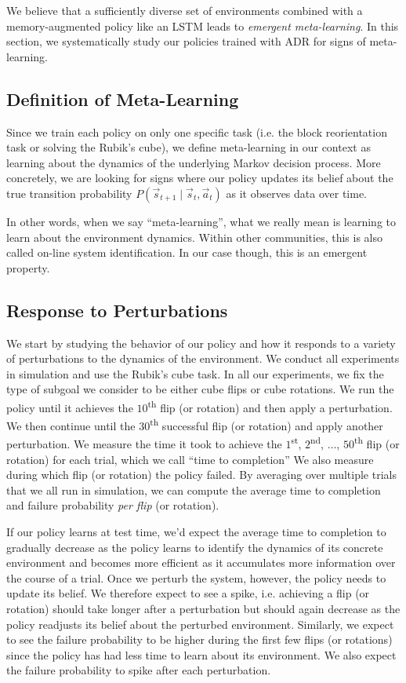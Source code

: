 We believe that a sufficiently diverse set of environments combined with a memory-augmented policy like an LSTM leads to \emph{emergent meta-learning}.
In this section, we systematically study our policies trained with ADR for signs of meta-learning.

\subsection{Definition of Meta-Learning}
Since we train each policy on only one specific task (i.e. the block reorientation task or solving the Rubik's cube), we define meta-learning in our context as learning about the dynamics of the underlying Markov decision process. More concretely, we are looking for signs where our policy updates its belief about the true transition probability $P(\vec{s}_{t+1} \mid \vec{s}_t, \vec{a}_t)$ as it observes data over time.

In other words, when we say ``meta-learning'', what we really mean is learning to learn about the environment dynamics. Within other communities, this is also called on-line system identification. In our case though, this is an emergent property.

\subsection{Response to Perturbations}
We start by studying the behavior of our policy and how it responds to a variety of perturbations to the dynamics of the environment. We conduct all experiments in simulation and use the Rubik's cube task. In all our experiments, we fix the type of subgoal we consider to be either cube flips or cube rotations. We run the policy until it achieves the $10$\textsuperscript{th} flip (or rotation) and then apply a perturbation. We then continue until the $30$\textsuperscript{th} successful flip (or rotation) and apply another perturbation. We measure the time it took to achieve the $1$\textsuperscript{st}, $2$\textsuperscript{nd}, $\ldots$, $50$\textsuperscript{th} flip (or rotation) for each trial, which we call ``time to completion'' We also measure during which flip (or rotation) the policy failed. By averaging over multiple trials that we all run in simulation, we can compute the average time to completion and failure probability \emph{per flip} (or rotation).

If our policy learns at test time, we'd expect the average time to completion to gradually decrease as the policy learns to identify the dynamics of its concrete environment and becomes more efficient as it accumulates more information over the course of a trial. Once we perturb the system, however, the policy needs to update its belief. We therefore expect to see a spike, i.e. achieving a flip (or rotation) should take longer after a perturbation but should again decrease as the policy readjusts its belief about the perturbed environment. Similarly, we expect to see the failure probability to be higher during the first few flips (or rotations) since the policy has had less time to learn about its environment. We also expect the failure probability to spike after each perturbation.

